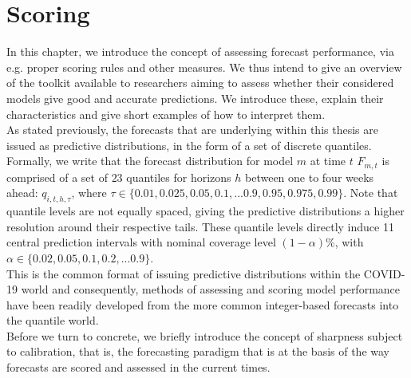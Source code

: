 \section{Scoring}
In this chapter, we introduce the concept of assessing forecast performance, via e.g. proper scoring rules and other measures. We thus intend to give an overview of the toolkit available to researchers aiming to assess whether their considered models give good and accurate predictions. We introduce these, explain their characteristics and give short examples of how to interpret them.\\ 
As stated previously, the forecasts that are underlying within this thesis are issued as predictive distributions, in the form of a set of discrete quantiles. Formally, we write that the forecast distribution for model $m$ at time $t$ $F_{m,t}$ is comprised of a set of $23$ quantiles for horizons $h$ between one to four weeks ahead: $q_{i, t, h, \tau}$, where $\tau \in \{0.01, 0.025, 0.05, 0.1, ... 0.9, 0.95, 0.975, 0.99\} $. Note that quantile levels are not equally spaced, giving the predictive distributions a higher resolution around their respective tails. These quantile levels directly induce 11 central prediction intervals with nominal coverage level $(1-\alpha)\%$, with $\alpha \in \{0.02, 0.05, 0.1, 0.2, ... 0.9\}$.\\
This is the common format of issuing predictive distributions within the COVID-19 world and consequently, methods of assessing and scoring model performance have been readily developed from the more common integer-based forecasts into the quantile world. \\
Before we turn to concrete, we briefly introduce the concept of sharpness subject to calibration, that is, the forecasting paradigm that is at the basis of the way forecasts are scored and assessed in the current times.\\
